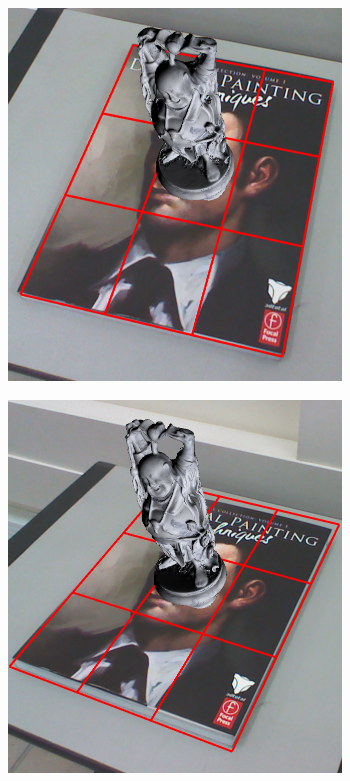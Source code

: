 \documentclass[annual]{acmsiggraph}
\begin{document}
\begin{figure}[t]
	\begin{subfigure}[c]{0.24\textwidth} \includegraphics[width=0.97\textwidth]{images/resBuddha2.png} \end{subfigure}%
	\begin{subfigure}[c]{0.24\textwidth} \includegraphics[width=0.97\textwidth]{images/resBuddha3.png} \end{subfigure}%

\end{figure}
\end{document}
